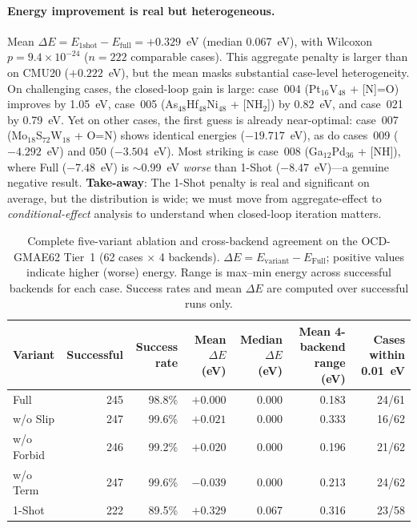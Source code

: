 \paragraph{Energy improvement is real but heterogeneous.}
Mean $\Delta E = E_{\mathrm{1shot}} - E_{\mathrm{full}} = +0.329$~eV (median 0.067~eV), with Wilcoxon $p = 9.4 \times 10^{-24}$ ($n=222$ comparable cases).
This aggregate penalty is larger than on CMU20 ($+0.222$~eV), but the mean masks substantial case-level heterogeneity.
On challenging cases, the closed-loop gain is large: case~004 (Pt$_{16}$V$_{48}$ + [N]=O) improves by 1.05~eV, case~005 (As$_{48}$Hf$_{48}$Ni$_{48}$ + [NH$_{2}$]) by 0.82~eV, and case~021 by 0.79~eV.
Yet on other cases, the first guess is already near-optimal: case~007 (Mo$_{18}$S$_{72}$W$_{18}$ + O=N) shows identical energies ($-19.717$~eV), as do cases~009 ($-4.292$~eV) and 050 ($-3.504$~eV).
Most striking is case~008 (Ga$_{12}$Pd$_{36}$ + [NH]), where Full ($-7.48$~eV) is $\sim$0.99~eV \emph{worse} than 1-Shot ($-8.47$~eV)---a genuine negative result.
\textbf{Take-away}: The 1-Shot penalty is real and significant on average, but the distribution is wide; we must move from aggregate-effect to \emph{conditional-effect} analysis to understand when closed-loop iteration matters.

\begin{table}[t]
\centering
\scriptsize
\caption{Complete five-variant ablation and cross-backend agreement on the OCD-GMAE62 Tier~1 (62 cases $\times$ 4 backends). $\Delta E = E_{\mathrm{variant}} - E_{\mathrm{Full}}$; positive values indicate higher (worse) energy. Range is max--min energy across successful backends for each case. Success rates and mean $\Delta E$ are computed over successful runs only.}
\label{tab:ocd62-tier1-full}
\begin{tabular}{lrrrrrr}
\toprule
Variant & Successful & Success rate & Mean $\Delta E$ (eV) & Median $\Delta E$ (eV) & Mean 4-backend range (eV) & Cases within 0.01~eV \\
\midrule
Full      & 245 & 98.8\% & $+0.000$ & 0.000 & 0.183 & 24/61 \\
w/o Slip & 247 & 99.6\% & $+0.021$ & $0.000$ & 0.333 & 16/62 \\
w/o Forbid & 246 & 99.2\% & $+0.020$ & $0.000$ & 0.196 & 21/62 \\
w/o Term & 247 & 99.6\% & $-0.039$ & $0.000$ & 0.213 & 24/62 \\
1-Shot    & 222 & 89.5\% & $+0.329$ & 0.067 & 0.316 & 23/58 \\
\bottomrule
\end{tabular}
\end{table}

